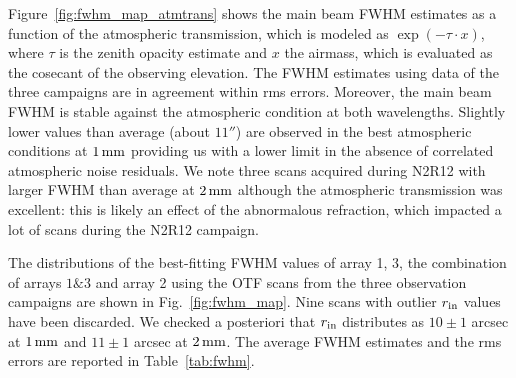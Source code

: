 Figure~\ref{fig:fwhm_map_atmtrans} shows the main beam FWHM estimates
as a function of the atmospheric transmission, which is modeled as
$\exp{\left(-\tau \cdot x\right)}$, where $\tau$ is the zenith opacity estimate and
$x$ the airmass, which is evaluated as the cosecant of the observing
elevation. The FWHM estimates using data of the three campaigns are in
agreement within rms errors. Moreover, the main beam FWHM is stable
against the atmospheric condition at both wavelengths. Slightly lower
values than average (about $11''$) are observed in the best
atmospheric conditions at $1\,\rm{mm}$ providing us with a lower limit
in the absence of correlated atmospheric noise residuals. We note
three scans acquired during N2R12 with larger FWHM than average at
$2\,\rm{mm}$ although the atmospheric transmission was excellent: this
is likely an effect of the abnormalous refraction, which impacted
a lot of scans during the N2R12 campaign. 

The distributions of the best-fitting FWHM values of array 1, 3, the
combination of arrays $1\&3$ and array 2 using the OTF scans from the
three observation campaigns are shown in Fig.~\ref{fig:fwhm_map}. Nine
scans with outlier $r_{\rm{in}}$ values have been discarded.
We checked a posteriori that $r_{\rm{in}}$
distributes as $10 \pm 1$ arcsec at $1\,\rm{mm}$ and $11 \pm 1$ arcsec
at $2\,\rm{mm}$. The average FWHM estimates and the rms errors are
reported in Table~\ref{tab:fwhm}.  


